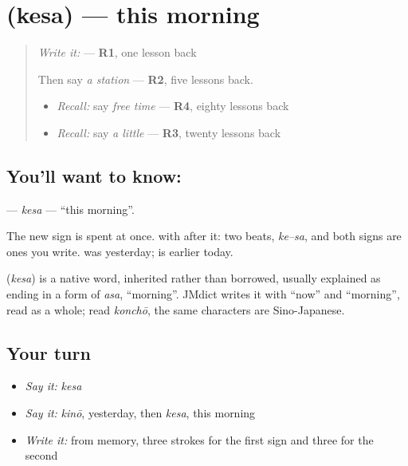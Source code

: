 \section[\texorpdfstring{\ja{けさ} (kesa)}{けさ (kesa)}]{ (kesa) — this morning}

\label{lesson:JA-C133-kesa}



\begin{quote}
\emph{Write it:} \textbf{} — \textbf{R1}, one lesson back

Then say \emph{a station} — \textbf{R2}, five lessons back.

\begin{itemize}
\raggedright
  \item \emph{Recall:} say \emph{free time} — \textbf{R4}, eighty lessons back
  \item \emph{Recall:} say \emph{a little} — \textbf{R3}, twenty lessons back
\end{itemize}
\end{quote}

\subsection*{You'll want to know: }
\textbf{} — \emph{kesa} — \textquotedblleft{}this morning\textquotedblright{}.

The new sign is spent at once. \textbf{} with \textbf{} after it: two beats, \emph{ke–sa}, and both signs are ones you write. \textbf{} was yesterday; \textbf{} is earlier today.

\begin{cousinweb}
\textbf{} (\emph{kesa}) is a native word, inherited rather than borrowed, usually explained as ending in a form of \emph{asa}, \textquotedblleft{}morning\textquotedblright{}. JMdict writes it with \textquotedblleft{}now\textquotedblright{} and \textquotedblleft{}morning\textquotedblright{}, read as a whole; read \emph{konchō}, the same characters are Sino-Japanese.
\end{cousinweb}

\subsection*{Your turn}
\begin{itemize}
\raggedright
  \item \emph{Say it:} \emph{kesa}
  \item \emph{Say it:} \emph{kinō}, yesterday, then \emph{kesa}, this morning
  \item \emph{Write it:} \textbf{} from memory, three strokes for the first sign and three for the second
\end{itemize}

